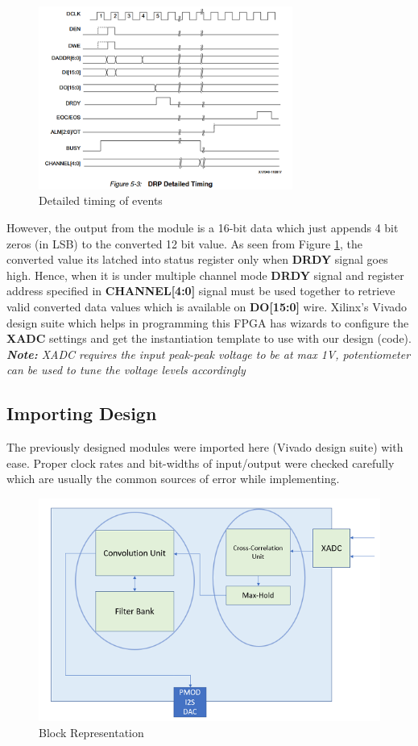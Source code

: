 \documentclass[BTech]{nitkdiss}
\begin{document}
\begin{figure}[h!]
    \centering
    \includegraphics[height = 6cm]{drp_timing.png}
    \caption{Detailed timing of events}
    \label{fig:drptiming}
\end{figure}

However, the output from the module is a 16-bit data which just appends 4 bit zeros (in LSB) to the converted 12 bit value. As seen from Figure \ref{fig:drptiming}, the converted value its latched into status register only when \textbf{DRDY} signal goes high. Hence, when it is under multiple channel mode \textbf{DRDY} signal and register address specified in \textbf{CHANNEL[4:0]} signal must be used together to retrieve valid converted data values which is available on \textbf{DO[15:0]} wire. Xilinx's Vivado design suite which helps in programming this FPGA has wizards to configure the \textbf{XADC} settings and get the instantiation template to use with our design (code). 
\textit{\textbf{Note:} XADC requires the input peak-peak voltage to be at max 1V, potentiometer can be used to tune the voltage levels accordingly}

\subsection{Importing Design}
The previously designed modules were imported here (Vivado design suite) with ease. Proper clock rates and bit-widths of input/output were checked carefully which are usually the common sources of error while implementing. 
\begin{figure}[h!]
    \centering
    \includegraphics{fpga_layout.png}
    \caption{Block Representation}
    \label{fig:fpgablock}
\end{figure}
\end{document}
